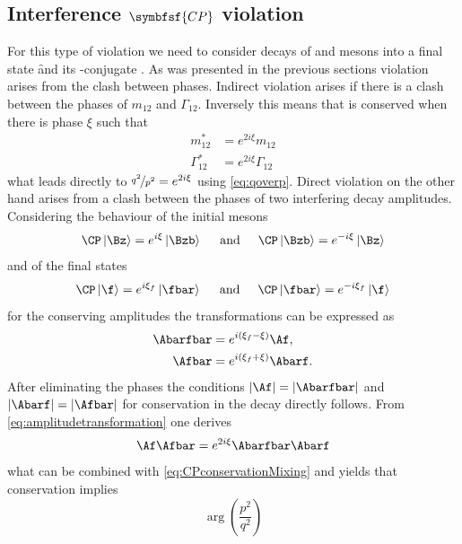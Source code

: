 \subsection[head={Interference \CP violation},tocentry={Interference \CP violation}]{Interference $\symbfsf{C{}P}$ violation}
\label{sec:InterferenceCPV}

For this type of \CP violation we need to consider decays of \Bz and \Bzb mesons into a final state \f and its \CP-conjugate \fbar.
As was presented in the previous sections \CP violation arises from the clash between phases.
Indirect \CP violation arises if there is a clash between the phases of $m_{12}$ and $\Gamma_{12}$.
Inversely this means that \CP is conserved when there is phase $\xi$ such that
\begin{equation}
\begin{split}
m_{12}^\ast &= e^{2i\xi}m_{12}\\
\Gamma_{12}^\ast &= e^{2i\xi}\Gamma_{12}\label{eq:CPconservationMixing}
\end{split}
\end{equation}
what leads directly to $\nicefrac{q^2}{p^2} = e^{2i\xi}$ using \cref{eq:qoverp}.
Direct \CP violation on the other hand arises from a clash between the phases of two interfering decay amplitudes.
Considering the behaviour of the initial \Bz mesons
\begin{equation}
\CP\left|\Bz\right> =e^{i\xi}\left|\Bzb\right>\hspace{0.5cm}\text{and}\hspace{0.5cm}\CP\left|\Bzb\right>=e^{-i\xi}\left|\Bz\right>
\end{equation}
and of the final states
\begin{equation}
\CP\left|\f\right> =e^{i\xi_f}\left|\fbar\right>\hspace{0.5cm}\text{and}\hspace{0.5cm}\CP\left|\fbar\right>=e^{-i\xi_f}\left|\f\right>
\end{equation}
for the \CP conserving amplitudes the transformations can be expressed as
\begin{equation}
\begin{split}
\Abarfbar&=e^{i\left(\xi_f-\xi\right)}\Af,\\
\Afbar&=e^{i\left(\xi_f+\xi\right)}\Abarf. \label{eq:amplitudetransformation}
\end{split}
\end{equation}
After eliminating the phases the conditions $\left|\Af\right|=\left|\Abarfbar\right|$ and $\left|\Abarf\right|=\left|\Afbar\right|$ for \CP conservation in the decay directly follows. From \cref{eq:amplitudetransformation} one derives
\begin{equation}
\Af\Afbar=e^{2i\xi}\Abarfbar\Abarf
\end{equation}
what can be combined with \cref{eq:CPconservationMixing} and yields that \CP conservation implies
\begin{equation}
\arg\left(\frac{p^2}{q^2}\right)
\end{equation}


